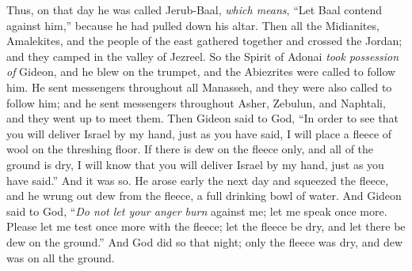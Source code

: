 \begin{biblechapter}
\verse Thus, on that day he was called Jerub-Baal, \textit{which means}, “Let Baal contend against him,” because he had pulled down his altar.
\verse Then all the Midianites, Amalekites, and the people of the east gathered together and crossed the Jordan; and they camped in the valley of Jezreel.
\verse So the Spirit of Adonai \textit{took possession of} Gideon, and he blew on the trumpet, and the Abiezrites were called to follow him.
\verse He sent messengers throughout all Manasseh, and they were also called to follow him; and he sent messengers throughout Asher, Zebulun, and Naphtali, and they went up to meet them.
 Then Gideon said to God, “In order to see that you will deliver Israel by my hand, just as you have said,
\verse I will place a fleece of wool on the threshing floor. If there is dew on the fleece only, and all of the ground is dry, I will know that you will deliver Israel by my hand, just as you have said.”
\verse And it was so. He arose early the next day and squeezed the fleece, and he wrung out dew from the fleece, a full drinking bowl of water.
\verse And Gideon said to God, “\textit{Do not let your anger burn} against me; let me speak once more. Please let me test once more with the fleece; let the fleece be dry, and let there be dew on the ground.”
\verse And God did so that night; only the fleece was dry, and dew was on all the ground.
\end{biblechapter}

